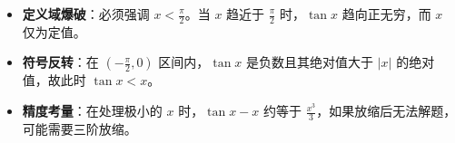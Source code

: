 \begin{trapbox}
\begin{itemize}
    \item \textbf{定义域爆破}：必须强调 $x < \frac{\pi}{2}$。当 $x$ 趋近于 $\frac{\pi}{2}$ 时，$\tan x$ 趋向正无穷，而 $x$ 仅为定值。
    \item \textbf{符号反转}：在 $(-\frac{\pi}{2}, 0)$ 区间内，$\tan x$ 是负数且其绝对值大于 $|x|$ 的绝对值，故此时 $\tan x < x$。
    \item \textbf{精度考量}：在处理极小的 $x$ 时，$\tan x - x$ 约等于 $\frac{x^3}{3}$，如果放缩后无法解题，可能需要三阶放缩。
\end{itemize}
\end{trapbox}